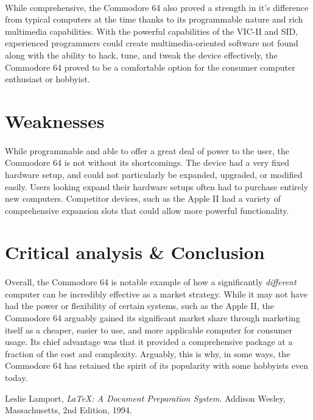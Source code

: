 \documentclass{article}
\begin{document}
\paragraph{}
While comprehensive, the Commodore 64 also proved a strength in it's difference from typical computers at the time thanks to its programmable nature and rich multimedia capabilities. With the powerful capabilities of the VIC-II and SID, experienced programmers could create multimedia-oriented software not found  along with the ability to hack, tune, and tweak the device effectively, the Commodore 64 proved to be a comfortable option for the consumer computer enthusiast or hobbyist. 

\section{Weaknesses}
\paragraph{}
While programmable and able to offer a great deal of power to the user, the Commodore 64 is not without its shortcomings. The device had a very fixed hardware setup, and could not particularly be expanded, upgraded, or modified easily. Users looking expand their hardware setups often had to purchase entirely new computers. Competitor devices, such as the Apple II had a variety of comprehensive expansion slots that could allow more powerful functionality. 

\section{Critical analysis \& Conclusion}
\paragraph{}
Overall, the Commodore 64 is notable example of how a significantly \textit{different} computer can be incredibly effective as a market strategy. While it may not have had the power or flexibility of certain systems, such as the Apple II, the Commodore 64 arguably gained its significant market share through marketing itself as a cheaper, easier to use, and more applicable computer for consumer usage. Its chief advantage was that it provided a comprehensive package at a fraction of the cost and complexity. Arguably, this is why, in some ways, the Commodore 64 has retained the spirit of its popularity with some hobbyists even today.

\pagebreak

\begin{thebibliography}{9}

  Leslie Lamport,
  \emph{\LaTeX: A Document Preparation System}.
  Addison Wesley, Massachusetts,
  2nd Edition,
  1994.

\end{thebibliography}
\end{document}

